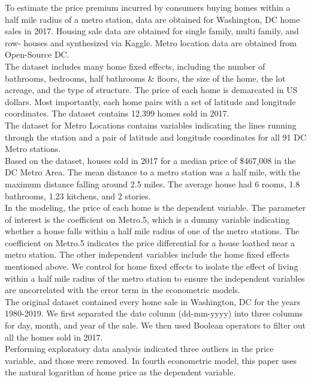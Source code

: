 \documentclass[12pt]{report}
\newcommand\tab[1][.60cm]{\hspace*{#1}}
\begin{document}
To estimate the price premium incurred by consumers buying homes within a half mile radius of a metro station, data are obtained for Washington, DC home sales in 2017. Housing sale data are obtained for single family, multi family, and row- houses and synthesized via Kaggle. Metro location data are obtained from Open-Source DC. \\
\tab The dataset includes many home fixed effects, including the number of bathrooms, bedrooms, half bathrooms \& floors, the size of the home, the lot acreage, and the type of structure. The price of each home is demarcated in US dollars. Most importantly, each home pairs with a set of latitude and longitude coordinates. The dataset contains 12,399 homes sold in 2017. \\
\tab The dataset for Metro Locations contains variables indicating the lines running through the station and a pair of latitude and longitude coordinates for all 91 DC Metro stations.\\
\tab Based on the dataset, houses sold in 2017 for a median price of \$467,008 in the DC Metro Area. The mean distance to a metro station was a half mile, with the maximum distance falling around 2.5 miles. The average house had 6 rooms, 1.8 bathrooms, 1.23 kitchens, and 2 stories.\\
\tab In the modeling, the price of each home is the dependent variable. The parameter of interest is the coefficient on Metro.5, which is a dummy variable indicating whether a house falls within a half mile radius of one of the metro stations. The coefficient on Metro.5 indicates the price differential for a house loathed near a metro station. The other independent variables include the home fixed effects mentioned above. We control for home fixed effects to isolate the effect of living within a half mile radius of the metro station to ensure the independent variables are uncorrelated with the error term in the econometric models.\\
\tab The original dataset contained every home sale in Washington, DC for the years 1980-2019. We first separated the date column (dd-mm-yyyy) into three columns for day, month, and year of the sale. We then used Boolean operators to filter out all the homes sold in 2017.\\
\tab Performing exploratory data analysis indicated three outliers in the price variable, and those were removed. In fourth econometric model, this paper uses the natural logarithm of home price as the dependent variable. \\
\end{document}

